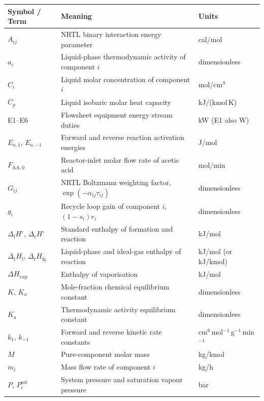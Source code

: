 \documentclass[10pt,a4paper]{article}
\newcommand{\hdrrow}{}
\renewcommand{\arraystretch}{1.28}
\begin{document}
\begin{table}[H]
\centering
\scriptsize
\renewcommand{\arraystretch}{1.12}
\setlength{\tabcolsep}{4pt}
\begin{tabularx}{\textwidth}{|C{3.3cm}|Z|C{4.3cm}|}
\hline
\hdrrow
\textbf{Symbol / Term} & \textbf{Meaning} & \textbf{Units} \\
\hline
$A_{ij}$ & NRTL binary interaction energy parameter & cal/mol \\
\hline
$a_i$ & Liquid-phase thermodynamic activity of component $i$ & dimensionless \\
\hline
$C_i$ & Liquid molar concentration of component $i$ & mol/cm$^3$ \\
\hline
$C_p$ & Liquid isobaric molar heat capacity & kJ/(kmol\,K) \\
\hline
E1--E6 & Flowsheet equipment energy stream duties & kW (E1 also W) \\
\hline
$E_{a,1}$, $E_{a,-1}$ & Forward and reverse reaction activation energies & J/mol \\
\hline
$F_{\mathrm{AA},0}$ & Reactor-inlet molar flow rate of acetic acid & mol/min \\
\hline
$G_{ij}$ & NRTL Boltzmann weighting factor, $\exp(-\alpha_{ij}\tau_{ij})$ & dimensionless \\
\hline
$g_i$ & Recycle loop gain of component $i$, $(1-s_i)r_i$ & dimensionless \\
\hline
$\Delta_{\mathrm{f}}H^\circ$, $\Delta_{\mathrm{r}}H^\circ$ & Standard enthalpy of formation and reaction & kJ/mol \\
\hline
$\Delta_{\mathrm{r}}H_{\mathrm{l}}$, $\Delta_{\mathrm{r}}H_{\mathrm{ig}}$ & Liquid-phase and ideal-gas enthalpy of reaction & kJ/mol (or kJ/kmol) \\
\hline
$\Delta H_{\mathrm{vap}}$ & Enthalpy of vaporisation & kJ/mol \\
\hline
$K$, $K_x$ & Mole-fraction chemical equilibrium constant & dimensionless \\
\hline
$K_a$ & Thermodynamic activity equilibrium constant & dimensionless \\
\hline
$k_1$, $k_{-1}$ & Forward and reverse kinetic rate constants & cm$^6$\,mol$^{-1}$\,g$^{-1}$\,min$^{-1}$ \\
\hline
$M$ & Pure-component molar mass & kg/kmol \\
\hline
$\dot{m}_i$ & Mass flow rate of component $i$ & kg/h \\
\hline
$P$, $P_i^{\mathrm{sat}}$ & System pressure and saturation vapour pressure & bar \\

\end{tabularx}
\end{table}
\end{document}
